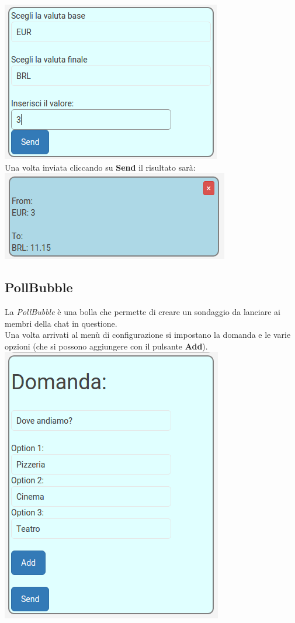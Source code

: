 \includegraphics[scale=0.75]{img/currConfig.png}
\\
Una volta inviata cliccando su \textbf{Send} il risultato sarà:\\

\includegraphics[scale=0.75]{img/curr.png}
\newpage
\subsection{PollBubble}
La \textit{PollBubble} è una bolla che permette di creare un sondaggio da lanciare ai membri della chat in questione.\\
Una volta arrivati al menù di configurazione si impostano la domanda e le varie opzioni (che si possono aggiungere con il pulsante \textbf{Add}).
\\

\includegraphics[scale=0.75]{img/pollConfig.png}

